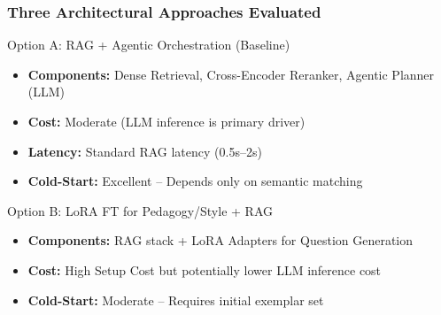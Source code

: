 \documentclass[aspectratio=169]{beamer}
\begin{document}
\begin{frame}
\frametitle{Three Architectural Approaches Evaluated}
\begin{block}{Option A: RAG + Agentic Orchestration (Baseline)}
\begin{itemize}
\item \textbf{Components:} Dense Retrieval, Cross-Encoder Reranker, Agentic Planner (LLM)
\item \textbf{Cost:} Moderate (LLM inference is primary driver)
\item \textbf{Latency:} Standard RAG latency (0.5s--2s)
\item \textbf{Cold-Start:} \textcolor{mygreen}{Excellent} -- Depends only on semantic matching
\end{itemize}
\end{block}

\begin{block}{Option B: LoRA FT for Pedagogy/Style + RAG}
\begin{itemize}
\item \textbf{Components:} RAG stack + LoRA Adapters for Question Generation
\item \textbf{Cost:} High Setup Cost but potentially lower LLM inference cost
\item \textbf{Cold-Start:} \textcolor{myorange}{Moderate} -- Requires initial exemplar set
\end{itemize}
\end{block}
\end{frame}
\end{document}
